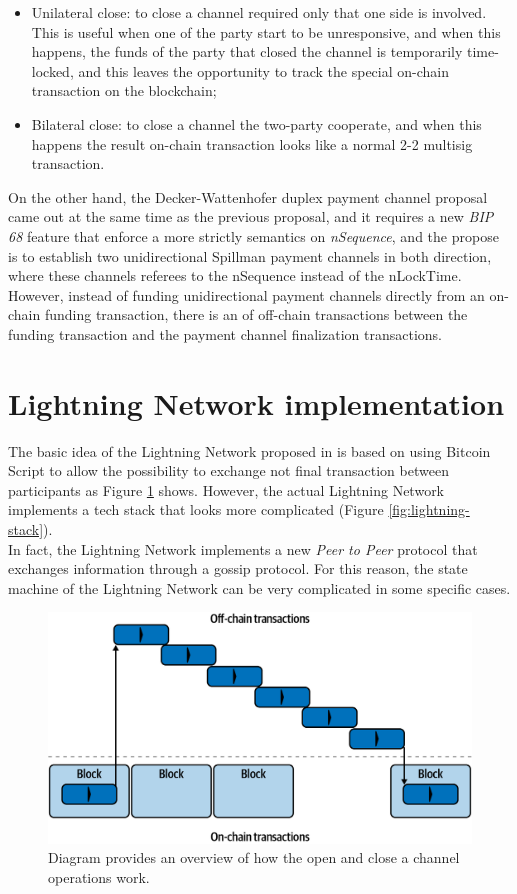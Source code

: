 \begin{itemize}
  \item Unilateral close: to close a channel required only that one side is involved. This is useful when one
        of the party start to be unresponsive, and when this happens, the funds of
        the party that closed the channel is temporarily time-locked, and this leaves the opportunity to
        track the special on-chain transaction on the blockchain;
  \item Bilateral close: to close a channel the two-party cooperate, and when this happens the result
        on-chain transaction looks like a normal 2-2 multisig transaction.
\end{itemize}

On the other hand, the Decker-Wattenhofer duplex payment channel proposal came out at the same time as the previous proposal, and
it requires a new \emph{BIP 68}\cite{bip68} feature that enforce a more strictly semantics on \emph{nSequence}, and the propose is to
establish two unidirectional Spillman payment channels in both
direction, where these channels referees to the nSequence instead of the nLockTime.
However, instead of funding unidirectional payment channels directly from an on-chain funding transaction, there is an  of off-chain transactions between the funding transaction and the payment channel finalization transactions.

\section{Lightning Network implementation}

The basic idea of the Lightning Network proposed in \cite{lightning-network-paper} is based on using Bitcoin Script
to allow the possibility to exchange not final transaction between participants as Figure \ref{fig:ln-onchain} shows.
However, the actual Lightning Network implements a tech stack that looks more complicated (Figure \ref{fig:lightning-stack}).\\
In fact, the Lightning Network implements a new \emph{Peer to Peer} protocol that exchanges information through
a gossip protocol. For this reason, the state machine of the Lightning Network
can be very complicated in some specific cases.

\begin{figure}[h]
  \begin{center}
  \includegraphics[width=0.6\columnwidth]{imgs/mtln_0702.png}
  \end{center}
  \caption{Diagram provides an overview of how the open and close a channel operations work.}
  \label{fig:ln-onchain}
\end{figure}


